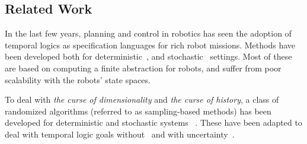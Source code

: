 \documentclass[letterpaper]{article} %
\newcommand{\cristi}[1]{{\color{orange} [Cristi] #1}}
\begin{document}
	\subsection{Related Work}
	
	In the last few years, planning and control in robotics has seen the adoption of temporal logics
	as specification languages for rich robot missions.
	Methods have been developed both for deterministic~\cite{KB-TAC08-LTLCon,kress-gazit:whereswaldo?,Murray2009,VaBe-IROS-2013}, and
    stochastic~\cite{Lahijanian2012,svorenova2013,Ayala2014,Cristi-CDC-2016,Kaelbling98} settings.
    Most of these are based on computing a finite abstraction for robots, and suffer from
    poor scalability with the robots' state spaces.
    
    To deal with {\em the curse of dimensionality} and {\em the curse of history}, a class of randomized
    algorithms (referred to as sampling-based methods) has been developed for deterministic \cite{KF-IJRR11,Kav96} and stochastic systems ~\cite{Ali14-IJRR,bry2011}.
    These have been adapted to deal with temporal logic goals without~\cite{bhatia2010sampling,VaBe-IROS-2013}
    and with uncertainty~\cite{Morteza-HSCC-2013,Cristi-CDC-2016}.
	
	
	
\end{document}
